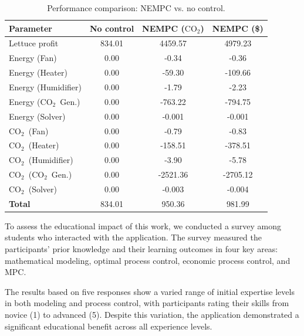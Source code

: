 \documentclass[conference]{IEEEtran}
\newcommand{\coo}{\ensuremath{\mathrm{CO_2}}}
\begin{document}
\begin{table}
    \centering
    \caption{Performance comparison: NEMPC {vs. } no control.}\label{tab:comparison}
    \setlength{\tabcolsep}{4pt} %
    \begin{tabular}{lS[table-format=3.2]S[table-format=4.2]S[table-format=4.2]}
        \toprule
        \textbf{Parameter}  & {No control} & {NEMPC (\coo)} & {NEMPC (\$)} \\
        \midrule
        Lettuce profit      & 834.01       & 4459.57        & 4979.23      \\
        Energy (Fan)        & 0.00         & -0.34          & -0.36        \\
        Energy (Heater)     & 0.00         & -59.30         & -109.66      \\
        Energy (Humidifier) & 0.00         & -1.79          & -2.23        \\
        Energy (\coo\ Gen.) & 0.00         & -763.22        & -794.75      \\
        Energy (Solver)     & 0.00         & -0.001         & -0.001       \\
        \coo\ (Fan)         & 0.00         & -0.79          & -0.83        \\
        \coo\ (Heater)      & 0.00         & -158.51        & -378.51      \\
        \coo\ (Humidifier)  & 0.00         & -3.90          & -5.78        \\
        \coo\ (\coo\ Gen.)  & 0.00         & -2521.36       & -2705.12     \\
        \coo\ (Solver)      & 0.00         & -0.003         & -0.004       \\
        \midrule
        \textbf{Total}      & 834.01       & 950.36         & 981.99       \\
        \bottomrule
    \end{tabular}
\end{table}

To assess the educational impact of this work, we conducted a survey among students who interacted with the application. The survey measured the participants' prior knowledge and their learning outcomes in four key areas: mathematical modeling, optimal process control, economic process control, and MPC.\@

The results based on five responses show a varied range of initial expertise levels in both modeling and process control, with participants rating their skills from novice (1) to advanced (5). Despite this variation, the application demonstrated a significant educational benefit across all experience levels.
\end{document}
